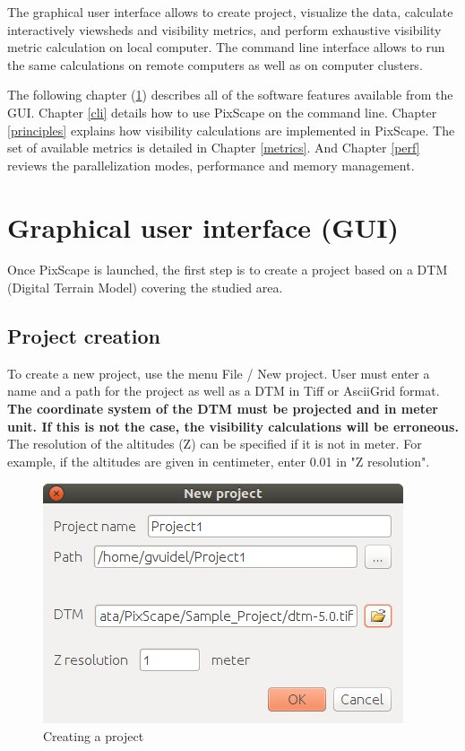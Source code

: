 \documentclass{report}
\begin{document}
The graphical user interface allows to create project, visualize the data, calculate interactively viewsheds and visibility metrics, and perform exhaustive visibility metric calculation on local computer. The command line interface allows to run the same calculations on remote computers as well as on computer clusters.

The following chapter (\ref{gui}) describes all of the software features available from the GUI. Chapter \ref{cli} details how to use PixScape on the command line. Chapter \ref{principles} explains how visibility calculations are implemented in PixScape. The set of available metrics is detailed in Chapter \ref{metrics}. And Chapter \ref{perf} reviews the parallelization modes, performance and memory management.


\chapter{Graphical user interface (GUI)}
\label{gui}

Once PixScape is launched, the first step is to create a project based on a DTM (Digital Terrain Model) covering the studied area.

\section{Project creation}

To create a new project, use the menu File / New project. User must enter a name and a path for the project as well as a DTM in Tiff or AsciiGrid format. \textbf{The coordinate system of the DTM must be projected and in meter unit. If this is not the case, the visibility calculations will be erroneous.} The resolution of the altitudes (Z) can be specified if it is not in meter. For example, if the altitudes are given in centimeter, enter 0.01 in "Z resolution".

\begin{figure}[H]
	\includegraphics[scale=0.5]{img/new_project-en.png} 
	\caption{Creating a project}
\end{figure}
\end{document}

